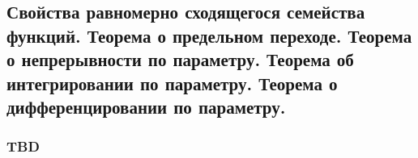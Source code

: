 \subsection{Свойства равномерно сходящегося семейства функций. Теорема о предельном переходе. Теорема о непрерывности по параметру. Теорема об интегрировании по параметру. Теорема о дифференцировании по параметру.}

\subsubsection{TBD}